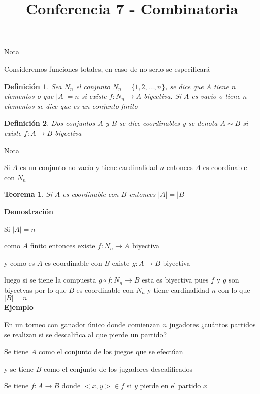\documentclass[a4paper,12pt]{report}
\title{Conferencia 7 - Combinatoria}
\author{}
\newtheorem*{teo}{Teorema}
\newtheorem*{dfn}{Definición}
\begin{document}
\maketitle


Nota

Consideremos funciones totales, en caso de no serlo se especificar\'a

\begin{dfn}
  Sea $N_n$ el conjunto $N_n=\{1,2,\dots,n\}$, se dice que $A$ tiene $n$ elementos o que $|A|=n$ si existe $f:N_n\rightarrow A$ biyectiva. Si $A$ es vacío o tiene $n$ elementos se dice que es un conjunto finito
\end{dfn}

\begin{dfn}
 Dos conjuntos $A$ y $B$ se dice coordinables y se denota $A \sim B$ si existe $f:A\rightarrow B$ biyectiva
\end{dfn}

Nota

Si $A$ es  un conjunto no vacío y tiene cardinalidad $n$ entonces  $A$ es coordinable con $N_n$

\begin{teo}
 Si $A$ es coordinable con $B$ entonces $|A|=|B|$
\end{teo}


\textbf{Demostración}

Si $|A|=n$ 

como $A$ finito entonces existe $f:N_n\rightarrow A$ biyectiva

y como es $A$ es coordinable con $B$ existe $g:A\rightarrow B$ biyectiva

luego si se tiene la compuesta $g\circ f: N_n\rightarrow B$ esta es biyectiva pues $f$ y $g$  son biyectvas por lo que $B$ es coordinable con $N_n$ y tiene cardinalidad $n$ con lo que $|B|=n$\\

\textbf{Ejemplo}
 
 En un torneo con ganador único donde comienzan $n$ jugadores ¿cuántos partidos se realizan si se descalifica al que pierde un partido?
 
 Se tiene $A$ como el conjunto de los juegos que se efectúan
 
 y se tiene $B$ como el conjunto de los jugadores descalificados
 
 Se tiene  $f:A\rightarrow B$ donde $<x,y>\in f$ si $y$ pierde en el partido $x$
 
\end{document}
